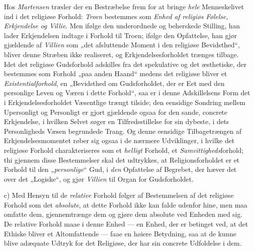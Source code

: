 Hos \emph{Martensen} træder der en Bestræbelse frem for at bringe \emph{hele}
Menneskelivet ind i det religiøse Forhold: \emph{Troen} bestemmes som
\emph{Enhed af religiøs Følelse, Erkjendelse og Villie}. Men ifølge den
underordnede og beherskede Stilling, han lader Erkjendelsen indtage i Forhold
til Troen; ifølge den Opfattelse, han gjør gjældende af \emph{Villien} som
„det afsluttende Moment i den religiøse Bevidsthed“, bliver denne Stræben ikke
realiseret, og Erkjendelsesforholdet trænges tilbage. Idet det religiøse
Gudsforhold adskilles fra det spekulative og det æsthetiske, der bestemmes som
Forhold „paa anden Haand“ medens det religiøse bliver et
\emph{Existentialforhold}, en „Bevidsthed om Gudsforholdet, der er Eet med den
personlige Leven og Væren i dette Forhold“, saa er i denne Adskillelsens Form
det i Erkjendelsesforholdet Væsentlige trængt tilside; den eensidige Sondring
mellem Upersonligt og Personligt er
 gjort gjældende ogsaa for den sande, concrete Erkjendelse, i hvilken Selvet
søger en Tilfredsstillelse for sin dybeste, i dets Personligheds Væsen
begrundede Trang. Og denne eensidige Tilbagetrængen af Erkjendelsesmomentet
røber sig ogsaa i de nærmere Udviklinger, i hvilke det religiøse Forhold
charakteriseres som et \emph{helligt} Forhold, et \emph{Samvittigheds}forhold;
thi gjennem disse Bestemmelser skal det udtrykkes, at Religionsforholdet er et
Forhold til den „\emph{personlige}“ Gud, i \emph{den} Opfattelse af Begrebet,
der hæver det over det „Logiske“, og gjør \emph{Villien} til Organ for
Gudsforholdet.

c) Med Hensyn til de \emph{relative} Forhold følger af Bestemmelsen af det
religiøse Forhold som det \emph{absolute}, at dette Forhold ikke kan falde
udenfor hine, men maa omfatte dem, gjennemtrænge dem og gjøre dem absolute ved
Enheden med sig. De relative Forhold maae i denne Enhed --- en Enhed, der er
betinget ved, at det Ethiske bliver et Altomfattende --- faae en høiere
Betydning, saa at de kunne blive adæquate Udtryk for det Religiøse, der har
sin concrete Udfoldelse i dem.

